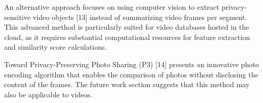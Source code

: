 An alternative approach focuses on using computer vision to extract privacy-sensitive video objects [13] instead of summarizing video frames per segment. This advanced method is particularly suited for video databases hosted in the cloud, as it requires substantial computational resources for feature extraction and similarity score calculations.

Toward Privacy-Preserving Photo Sharing (P3) [14] presents an innovative photo encoding algorithm that enables the comparison of photos without disclosing the content of the frames. The future work section suggests that this method may also be applicable to videos.
